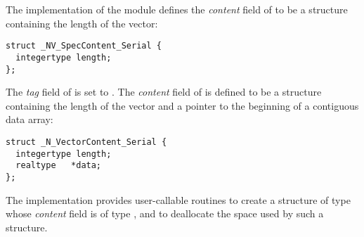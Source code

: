 %
The {\nvecs} implementation of the {\nvector} module
defines the {\em content} field of  to be a structure 
containing the length of the vector:
\begin{verbatim}
struct _NV_SpecContent_Serial {
  integertype length;
};
\end{verbatim}
The {\em tag} field of  is set to .
The {\em content} field of  is defined to be a structure containing
the length of the vector and a pointer to the beginning of a contiguous data array:
\begin{verbatim} 
struct _N_VectorContent_Serial {
  integertype length;
  realtype   *data;
};
\end{verbatim}

The {\nvecs} implementation provides user-callable routines  
to create a structure of type  whose {\em content} field is 
of type , and  
to deallocate the space used by such a structure. 

